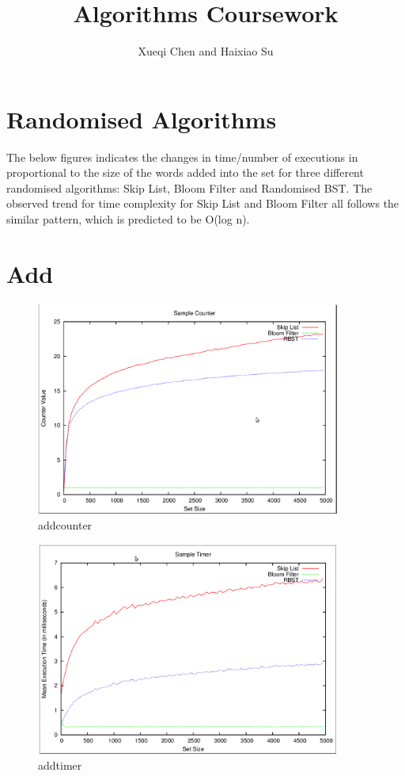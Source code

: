 \documentclass[11pt]{article}
\begin{document}
\title{Algorithms Coursework}
\author{Xueqi Chen and Haixiao Su}

\maketitle
\section*{Randomised Algorithms}
The below figures indicates the changes in time/number of executions in proportional to the size of the words added into the set for three different randomised algorithms: Skip List, Bloom Filter and Randomised BST. The observed trend for time complexity for Skip List and Bloom Filter all follows the similar pattern, which is predicted to be O(log n).
\section*{Add}
\begin{figure}[ht]
\centering
\includegraphics[height=70mm,width=100mm]{addcounter.png}
\caption{addcounter}
\end{figure}
\begin{figure}[ht]
\centering
\includegraphics[height=70mm,width=100mm]{addtimer.png}
\caption{addtimer}
\end{figure}
\end{document}

